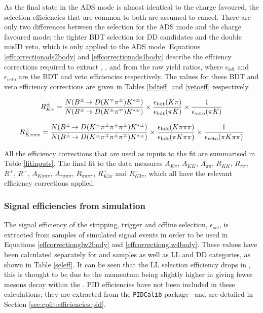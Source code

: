 As the final state in the ADS mode is almost identical to the charge favoured, the selection efficiencies that are common to both are assumed to cancel. There are only two differences between the selection for the ADS mode and the charge favoured mode; the tighter BDT selection for DD candidates and the double misID veto, which is only applied to the ADS mode. Equations \ref{effcorrectionads2body} and \ref{effcorrectionads4body} describe the effciency corrections required to extract \Rptwo, \Rmtwo, \Rpfour and \Rmfour from the raw yield ratios, where $\epsilon_{bdt}$ and $\epsilon_{veto}$ are the BDT and veto efficiencies respectively. The values for these BDT and veto efficiency corrections are given in Tables \ref{bdteff} and \ref{vetoeff} respectively.

{\footnotesize
\begin{equation}
R^{\pm}_{K\pi} = \frac{N({{B}^\pm}\!\rightarrow {\ensuremath{D}}({{K}^\mp}{{\pi}^\pm}){{K}^{*\pm}})}{N({{B}^\pm}\!\rightarrow {\ensuremath{D}}({{K}^\pm}{{\pi}^\mp}){{K}^{*\pm}})} \times \frac{\epsilon_{\text{bdt}}(K\pi)}{\epsilon_{\text{bdt}}(\pi K)} \times \frac{1}{\epsilon_{\text{veto}}(\pi K)}
\label{effcorrectionads2body}
\end{equation}

\begin{equation}
R^{\pm}_{K\pi\pi\pi} = \frac{N({{B}^\pm}\!\rightarrow {\ensuremath{D}}({{K}^\mp}{{\pi}^\pm}{{\pi}^\mp}{{\pi}^\pm}){{K}^{*\pm}})}{N({{B}^\pm}\!\rightarrow {\ensuremath{D}}({{K}^\pm}{{\pi}^\mp}{{\pi}^\pm}{{\pi}^\mp}){{K}^{*\pm}})} \times \frac{\epsilon_{\text{bdt}}(K\pi\pi\pi)}{\epsilon_{\text{bdt}}(\pi K\pi\pi)} \times \frac{1}{\epsilon_{\text{veto}}(\pi K\pi\pi)}
\label{effcorrectionads4body}
\end{equation}}

All the efficiency corrections that are used as inputs to the fit are summarised in Table \ref{fitinputs}. The final fit to the data measures $A_{K\pi}$, $A_{KK}$, $A_{\pi\pi}$, $R_{KK}$, $R_{\pi\pi}$, $R^+$,  $R^-$, $A_{K\pi\pi\pi}$, $A_{\pi\pi\pi\pi}$, $R_{\pi\pi\pi\pi}$, $R^+_{K3\pi}$ and  $R^-_{K3\pi}$, which all have the relevant efficiency corrections applied.


\subsubsection{Signal efficiencies from simulation}
\label{sec:cpfit:efficiencies:signal}

The signal efficiency of the stripping, trigger and offline selection, $\epsilon_{sel}$, is extracted from samples of simulated signal events in order to be used in Equations \ref{effcorrectionglw2body} and \ref{effcorrectionglw4body}. These values have been calculated separately for \runone and \runtwo samples as well as LL and DD categories, as shown in Table \ref{seleff}. It can be seen that the LL selection efficiency drops in \runtwo, this is thought to be due to the \KS momentum being slightly higher in \runtwo giving fewer \KS mesons decay within the \velo. PID efficiencies have not been included in these calculations; they are extracted from the {\tt PIDCalib} package~\cite{PIDCalib} and are detailed in Section \ref{sec:cpfit:efficiencies:pid}.

